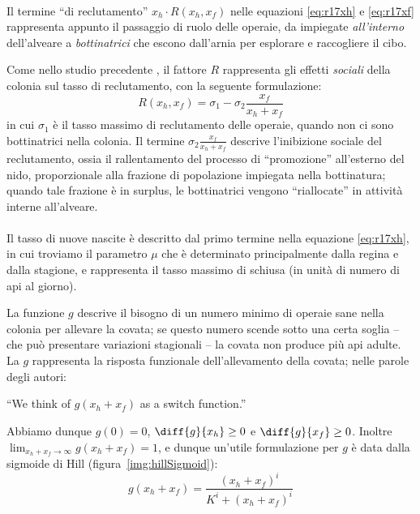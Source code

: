 \paragraph{}
Il termine ``di reclutamento'' $x_h \cdot R(x_h, x_f)$ nelle equazioni \eqref{eq:r17xh} e \eqref{eq:r17xf} rappresenta appunto il passaggio di ruolo delle operaie, da impiegate \emph{all'interno} dell'alveare a \emph{bottinatrici} che escono dall'arnia per esplorare e raccogliere il cibo.

Come nello studio precedente \cite{khoury2011}, il fattore $R$ rappresenta gli effetti \emph{sociali}
della colonia sul tasso di reclutamento, con la seguente formulazione:
\begin{equation}
    \label{eq:reclutam}
    R(x_h, x_f) = \sigma_1 - \sigma_2 \frac{x_f}{x_h + x_f}
\end{equation}
in cui $\sigma_1$ è il tasso massimo di reclutamento delle operaie, quando non ci sono bottinatrici nella colonia.
Il termine $\sigma_2 \frac{x_f}{x_h + x_f}$ descrive l'inibizione sociale del reclutamento, ossia il rallentamento del processo di ``promozione'' all'esterno del nido, proporzionale alla frazione di popolazione impiegata nella bottinatura; quando tale frazione è in surplus, le bottinatrici vengono ``riallocate'' in attività interne all'alveare.

\paragraph{}
Il tasso di nuove nascite è descritto dal primo termine nella equazione \eqref{eq:r17xh}, in cui troviamo il parametro $\mu$ che è determinato principalmente dalla regina e dalla stagione, e rappresenta il tasso massimo di schiusa (in unità di numero di api al giorno).

La funzione $g$ descrive il bisogno di un numero minimo di operaie sane nella colonia per allevare la covata; se questo numero scende sotto una certa soglia -- che può presentare variazioni stagionali -- la covata non produce più api adulte.
La $g$ rappresenta la risposta funzionale dell'allevamento della covata; nelle parole degli autori:
\begin{displayquote}
``We think of $g(x_h + x_f)$ as a switch function.''
\end{displayquote}

Abbiamo dunque $g(0)=0$, $\diff{g}{x_h} \geq 0$ e $\diff{g}{x_f} \geq 0$. Inoltre $\lim_{x_h+x_f \to \infty} g(x_h+x_f)=1$, e dunque un'utile formulazione per $g$ è data dalla sigmoide di Hill (figura~\ref{img:hillSigmoid}):
\begin{equation}
    g(x_h + x_f) = \frac{ (x_h+x_f)^i }{ K^i + (x_h+x_f)^i }
    \label{eq:hillSigmoid}
\end{equation}

